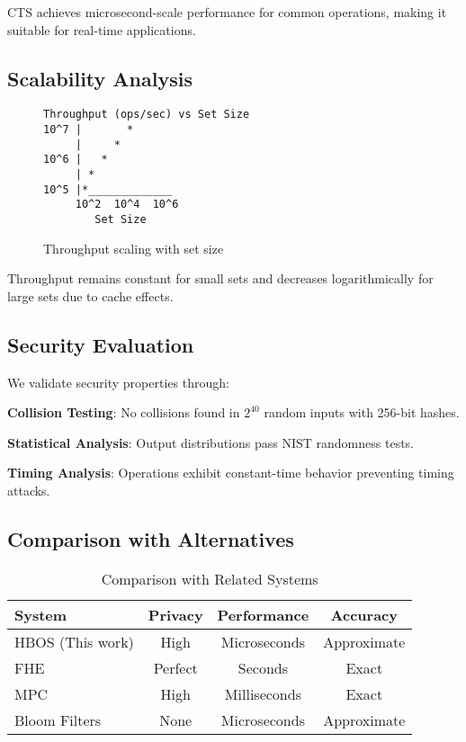 \documentclass[10pt,conference]{IEEEtran}
\begin{document}
CTS achieves microsecond-scale performance for common operations, making it suitable for real-time applications.

\subsection{Scalability Analysis}

\begin{figure}[h]
\centering
\begin{lstlisting}[language={},basicstyle=\scriptsize\ttfamily,frame=none]
Throughput (ops/sec) vs Set Size
10^7 |       *
     |     *
10^6 |   *
     | *
10^5 |*_____________
     10^2  10^4  10^6
        Set Size
\end{lstlisting}
\caption{Throughput scaling with set size}
\label{fig:scalability}
\end{figure}

Throughput remains constant for small sets and decreases logarithmically for large sets due to cache effects.

\subsection{Security Evaluation}

We validate security properties through:

\textbf{Collision Testing}: No collisions found in $2^{40}$ random inputs with 256-bit hashes.

\textbf{Statistical Analysis}: Output distributions pass NIST randomness tests.

\textbf{Timing Analysis}: Operations exhibit constant-time behavior preventing timing attacks.

\subsection{Comparison with Alternatives}

\begin{table}[h]
\centering
\caption{Comparison with Related Systems}
\label{tab:comparison}
\begin{tabular}{lccc}
\toprule
System & Privacy & Performance & Accuracy \\
\midrule
HBOS (This work) & High & Microseconds & Approximate \\
FHE & Perfect & Seconds & Exact \\
MPC & High & Milliseconds & Exact \\
Bloom Filters & None & Microseconds & Approximate \\
\bottomrule
\end{tabular}
\end{table}
\end{document}
